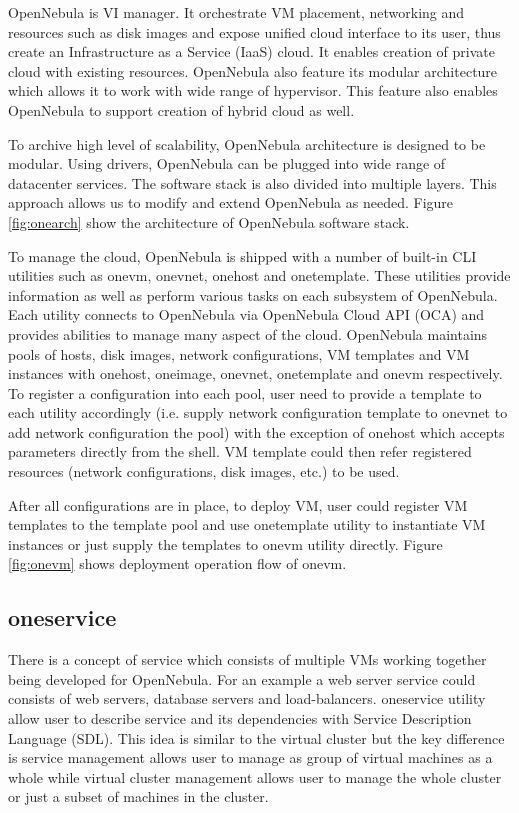 \documentclass[conference]{IEEEtran}
\begin{document}
OpenNebula is VI manager. It orchestrate VM placement, networking and resources such as disk images and expose unified cloud interface to its user, thus create an Infrastructure as a Service (IaaS) cloud.
It enables creation of private cloud with existing resources.
OpenNebula also feature its modular architecture which allows it to work with wide range of hypervisor.
This feature also enables OpenNebula to support creation of hybrid cloud as well.

To archive high level of scalability, OpenNebula architecture is designed to be modular.
Using drivers, OpenNebula can be plugged into wide range of datacenter services.
The software stack is also divided into multiple layers.
This approach allows us to modify and extend OpenNebula as needed.
Figure \ref{fig:onearch} show the architecture of OpenNebula software stack.

To manage the cloud, OpenNebula is shipped with a number of built-in CLI utilities such as onevm, onevnet, onehost and onetemplate.
These utilities provide information as well as perform various tasks on each subsystem of OpenNebula.
Each utility connects to OpenNebula via OpenNebula Cloud API (OCA) and provides abilities to manage many aspect of the cloud.
OpenNebula maintains pools of hosts, disk images, network configurations, VM templates and VM instances with onehost, oneimage, onevnet, onetemplate and onevm respectively.
To register a configuration into each pool, user need to provide a template to each utility accordingly (i.e. supply network configuration template to onevnet to add network configuration the pool) with the exception of onehost which accepts parameters directly from the shell.
VM template could then refer registered resources (network configurations, disk images, etc.) to be used.

After all configurations are in place, to deploy VM, user could register VM templates to the template pool and use onetemplate utility to instantiate VM instances or just supply the templates to onevm utility directly.
Figure \ref{fig:onevm} shows deployment operation flow of onevm.

\subsection{oneservice}
There is a concept of service which consists of multiple VMs working together being developed for OpenNebula.
For an example a web server service could consists of web servers, database servers and load-balancers.
oneservice\cite{oneservice} utility allow user to describe service and its dependencies with Service Description Language (SDL).
This idea is similar to the virtual cluster but the key difference is service management allows user to manage as group of virtual machines as a whole while virtual cluster management allows user to manage the whole cluster or just a subset of machines in the cluster.
\end{document}
